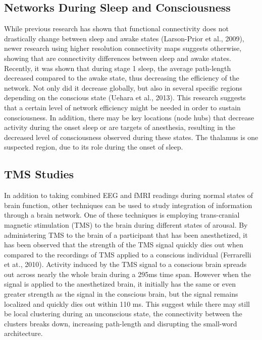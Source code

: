 \documentclass[11pt,letterpaper,doublespacing,titlepage]{article}
\begin{document}
\subsection{Networks During Sleep and Consciousness}
\par
While previous research has shown that functional connectivity does not drastically change between sleep and awake states (Larson-Prior et al., 2009), newer research using higher resolution connectivity maps suggests otherwise, showing that are connectivity differences between sleep and awake states. Recently, it was shown that during stage 1 sleep, the average path-length decreased compared to the awake state, thus decreasing the efficiency of the network. Not only did it decrease globally, but also in several specific regions depending on the conscious state (Uehara et al., 2013). This research suggests that a certain level of network efficiency might be needed in order to sustain consciousness. In addition, there may be key locations (node hubs) that decrease activity during the onset sleep or are targets of anesthesia, resulting in the decreased level of consciousness observed during these states. The thalamus is one suspected region, due to its role during the onset of sleep.
\subsection{TMS Studies}
\par
In addition to taking combined EEG and fMRI readings during normal states of brain function, other techniques can be used to study integration of information through a brain network. One of these techniques is employing trans-cranial magnetic stimulation (TMS) to the brain during different states of arousal. By administering TMS to the brain of a participant that has been anesthetized, it has been observed that the strength of the TMS signal quickly dies out when compared to the recordings of TMS applied to a conscious individual (Ferrarelli et at., 2010).  Activity induced by the TMS signal to a conscious brain spreads out across nearly the whole brain during a 295ms time span. However when the signal is applied to the anesthetized brain, it initially has the same or even greater strength as the signal in the conscious brain, but the signal remains localized and quickly dies out within 110 ms. This suggest while there may still be local clustering during an unconscious state, the connectivity between the clusters breaks down, increasing path-length and disrupting the small-word architecture. 
\end{document}
